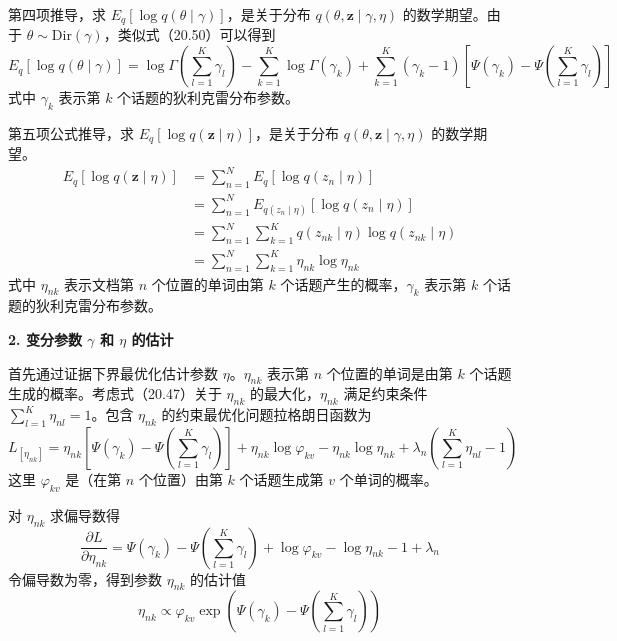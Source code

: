 \documentclass[UTF8,12pt,a4paper,fontset=fandol]{ctexart}
\begin{document}
第四项推导，求 $E_q[\log q(\theta\mid\gamma)]$，是关于分布 $q(\theta,\mathbf{z}\mid\gamma,\eta)$ 的数学期望。由于 $\theta\sim\mathrm{Dir}(\gamma)$，类似式（20.50）可以得到
\begin{equation}
E_q[\log q(\theta\mid\gamma)]=\log\Gamma\left(\sum_{l=1}^K\gamma_l\right)-\sum_{k=1}^K\log\Gamma(\gamma_k)+\sum_{k=1}^K(\gamma_k-1)\left[\Psi(\gamma_k)-\Psi\left(\sum_{l=1}^K\gamma_l\right)\right]
\tag{20.54}
\end{equation}
式中 $\gamma_k$ 表示第 $k$ 个话题的狄利克雷分布参数。

第五项公式推导，求 $E_q[\log q(\mathbf{z}\mid\eta)]$，是关于分布 $q(\theta,\mathbf{z}\mid\gamma,\eta)$ 的数学期望。
\begin{equation}
\begin{aligned}
E_q[\log q(\mathbf{z}\mid\eta)]
&=\sum_{n=1}^N E_q[\log q(z_n\mid\eta)]\\
&=\sum_{n=1}^N E_{q(z_n\mid\eta)}[\log q(z_n\mid\eta)]\\
&=\sum_{n=1}^N\sum_{k=1}^K q(z_{nk}\mid\eta)\log q(z_{nk}\mid\eta)\\
&=\sum_{n=1}^N\sum_{k=1}^K \eta_{nk}\log\eta_{nk}
\end{aligned}
\tag{20.55}
\end{equation}
式中 $\eta_{nk}$ 表示文档第 $n$ 个位置的单词由第 $k$ 个话题产生的概率，$\gamma_k$ 表示第 $k$ 个话题的狄利克雷分布参数。

\noindent\textbf{2. 变分参数 $\gamma$ 和 $\eta$ 的估计}

首先通过证据下界最优化估计参数 $\eta$。$\eta_{nk}$ 表示第 $n$ 个位置的单词是由第 $k$ 个话题生成的概率。考虑式（20.47）关于 $\eta_{nk}$ 的最大化，$\eta_{nk}$ 满足约束条件 $\sum_{l=1}^K\eta_{nl}=1$。包含 $\eta_{nk}$ 的约束最优化问题拉格朗日函数为
\begin{equation}
L_{[\eta_{nk}]}=\eta_{nk}\left[\Psi(\gamma_k)-\Psi\left(\sum_{l=1}^K\gamma_l\right)\right]+\eta_{nk}\log\varphi_{kv}-\eta_{nk}\log\eta_{nk}+\lambda_n\left(\sum_{l=1}^K\eta_{nl}-1\right)
\tag{20.56}
\end{equation}
这里 $\varphi_{kv}$ 是（在第 $n$ 个位置）由第 $k$ 个话题生成第 $v$ 个单词的概率。

对 $\eta_{nk}$ 求偏导数得
\begin{equation}
\frac{\partial L}{\partial \eta_{nk}}=\Psi(\gamma_k)-\Psi\left(\sum_{l=1}^K\gamma_l\right)+\log\varphi_{kv}-\log\eta_{nk}-1+\lambda_n
\tag{20.57}
\end{equation}
令偏导数为零，得到参数 $\eta_{nk}$ 的估计值
\begin{equation}
\eta_{nk}\propto \varphi_{kv}\exp\left(\Psi(\gamma_k)-\Psi\left(\sum_{l=1}^K\gamma_l\right)\right)
\tag{20.58}
\end{equation}
\end{document}
